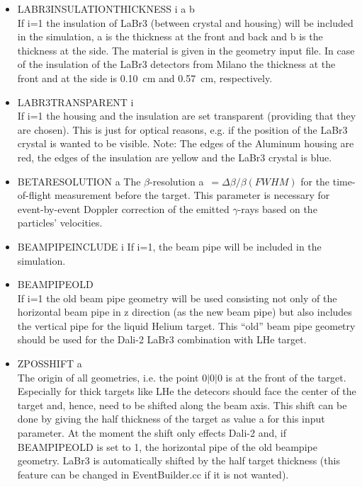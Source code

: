 \documentclass[12pt]{book}
\begin{document}
\begin{itemize}
\item LABR3INSULATIONTHICKNESS i a b\\
	If i=1 the insulation of LaBr3 (between crystal and housing) will be included in the simulation, a is the thickness at the front and back and b is the thickness at the side. The material is given in the geometry input file. In case of the insulation of the LaBr3 detectors from Milano the thickness at the front and at the side is 0.10~cm and 0.57~cm, respectively.\\
\item LABR3TRANSPARENT i\\
	If i=1 the housing and the insulation are set transparent (providing that they are chosen). This is just for optical reasons, e.g. if the position of the LaBr3 crystal is wanted to be visible. Note: The edges of the Aluminum housing are red, the edges of the insulation are yellow and the LaBr3 crystal is blue.


\item BETARESOLUTION a \hfill{} \linebreak
  The $\beta$-resolution a~$=\Delta \beta / \beta (FWHM)$ for the time-of-flight measurement before the target.
  This parameter is necessary for event-by-event Doppler correction of the emitted $\gamma$-rays based on the
  particles' velocities.
\item BEAMPIPEINCLUDE i\hfill{} \linebreak
  If i=1, the beam pipe will be included in the simulation.
\item BEAMPIPEOLD\\
	If i=1 the old beam pipe geometry will be used consisting not only of the horizontal beam pipe in z direction (as the new beam pipe) but also includes the vertical pipe for the liquid Helium target. This ``old'' beam pipe geometry should  be used for the Dali-2 LaBr3 combination with LHe target.
  
\item ZPOSSHIFT a\\
	The origin of all geometries, i.e. the point $0|0|0$ is at the front of the target. Especially for thick targets like LHe the detecors should face the center of the target and, hence, need to be shifted along the beam axis. This shift can be done by giving the half thickness of the target as value a for this input parameter. At the moment the shift only effects Dali-2 and, if BEAMPIPEOLD is set to 1, the horizontal pipe of the old beampipe geometry. LaBr3 is automatically shifted by the half target thickness (this feature can be changed in EventBuilder.cc if it is not wanted).


\end{itemize}
\end{document}
